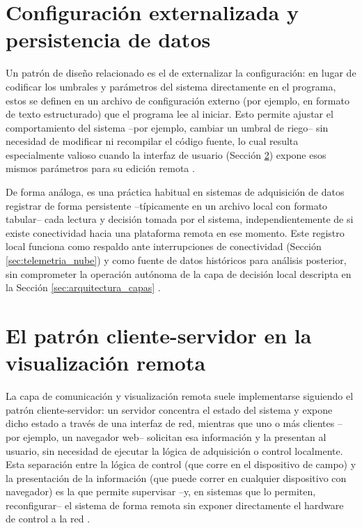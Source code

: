 \section{Configuración externalizada y persistencia de datos}
\label{sec:config_persistencia}

Un patrón de diseño relacionado es el de externalizar la configuración: en lugar de codificar los umbrales y parámetros del sistema directamente en el programa, estos se definen en un archivo de configuración externo (por ejemplo, en formato de texto estructurado) que el programa lee al iniciar. Esto permite ajustar el comportamiento del sistema --por ejemplo, cambiar un umbral de riego-- sin necesidad de modificar ni recompilar el código fuente, lo cual resulta especialmente valioso cuando la interfaz de usuario (Sección \ref{sec:cliente_servidor}) expone esos mismos parámetros para su edición remota \cite{twelve_factor_config}.

De forma análoga, es una práctica habitual en sistemas de adquisición de datos registrar de forma persistente --típicamente en un archivo local con formato tabular-- cada lectura y decisión tomada por el sistema, independientemente de si existe conectividad hacia una plataforma remota en ese momento. Este registro local funciona como respaldo ante interrupciones de conectividad (Sección \ref{sec:telemetria_nube}) y como fuente de datos históricos para análisis posterior, sin comprometer la operación autónoma de la capa de decisión local descripta en la Sección \ref{sec:arquitectura_capas} \cite{park2003daq}.

\section{El patrón cliente-servidor en la visualización remota}
\label{sec:cliente_servidor}

La capa de comunicación y visualización remota suele implementarse siguiendo el patrón cliente-servidor: un servidor concentra el estado del sistema y expone dicho estado a través de una interfaz de red, mientras que uno o más clientes --por ejemplo, un navegador web-- solicitan esa información y la presentan al usuario, sin necesidad de ejecutar la lógica de adquisición o control localmente. Esta separación entre la lógica de control (que corre en el dispositivo de campo) y la presentación de la información (que puede correr en cualquier dispositivo con navegador) es la que permite supervisar --y, en sistemas que lo permiten, reconfigurar-- el sistema de forma remota sin exponer directamente el hardware de control a la red \cite{kurose_ross2021}.

